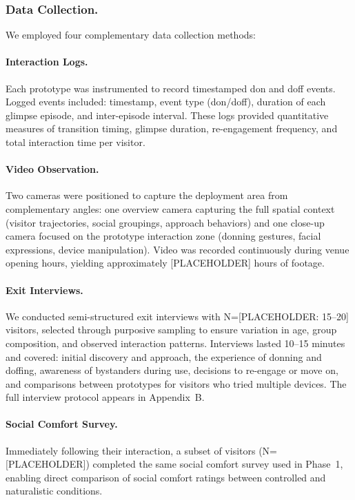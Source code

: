 \subsubsection{Data Collection.}
We employed four complementary data collection methods:

\paragraph{Interaction Logs.}
Each prototype was instrumented to record timestamped don and doff events. Logged events included: timestamp, event type (don/doff), duration of each glimpse episode, and inter-episode interval. These logs provided quantitative measures of transition timing, glimpse duration, re-engagement frequency, and total interaction time per visitor.

\paragraph{Video Observation.}
Two cameras were positioned to capture the deployment area from complementary angles: one overview camera capturing the full spatial context (visitor trajectories, social groupings, approach behaviors) and one close-up camera focused on the prototype interaction zone (donning gestures, facial expressions, device manipulation). Video was recorded continuously during venue opening hours, yielding approximately [PLACEHOLDER] hours of footage.

\paragraph{Exit Interviews.}
We conducted semi-structured exit interviews with N=[PLACEHOLDER: 15--20] visitors, selected through purposive sampling to ensure variation in age, group composition, and observed interaction patterns. Interviews lasted 10--15 minutes and covered: initial discovery and approach, the experience of donning and doffing, awareness of bystanders during use, decisions to re-engage or move on, and comparisons between prototypes for visitors who tried multiple devices. The full interview protocol appears in Appendix~B.

\paragraph{Social Comfort Survey.}
Immediately following their interaction, a subset of visitors (N=[PLACEHOLDER]) completed the same social comfort survey used in Phase~1, enabling direct comparison of social comfort ratings between controlled and naturalistic conditions.

